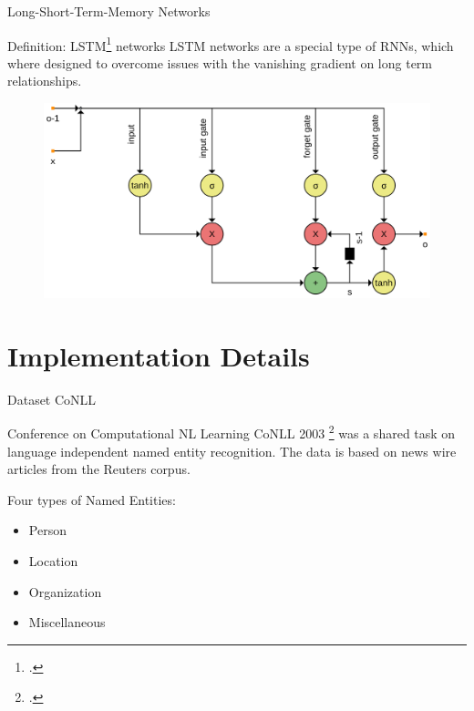 \documentclass[12pt, tikz]{beamer}
\begin{document}
\begin{frame}[fragile]{Long-Short-Term-Memory Networks}

	\begin{block}{Definition: LSTM\footcite{hochreiter1997long} networks}
		LSTM networks are a special type of RNNs, which where designed to overcome issues with the vanishing gradient on long term relationships.
	\end{block}
	\pause
	\vspace{-0.5cm}
	\begin{center}
		\begin{figure}
			\includegraphics[width=0.9\linewidth]{img/lstm.png}
		\end{figure}
	\end{center}
\end{frame}

\section{Implementation Details}

\begin{frame}[fragile]{Dataset CoNLL}
	
	\begin{block}{Conference on Computational NL Learning}
		CoNLL 2003 \footcite{tjongkimsang2003conll} was a shared task on language independent named entity recognition. The data is based on news wire articles from the Reuters corpus.
	\end{block}
	\pause
	Four types of Named Entities:
	\begin{itemize}
		\item Person
		\item Location
		\item Organization
		\item Miscellaneous
	\end{itemize}

\end{frame}
\end{document}

